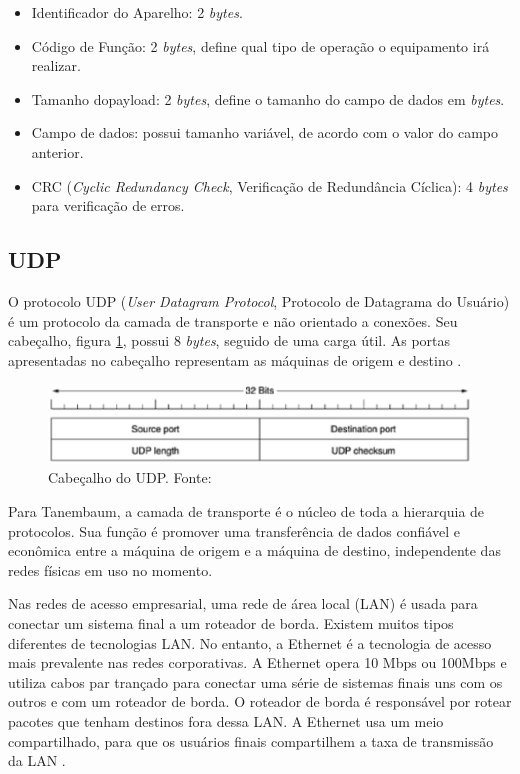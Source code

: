    \begin{itemize}
        \item Identificador do Aparelho: 2 \textit{bytes}.
        \item Código de Função: 2 \textit{bytes}, define qual tipo de operação o equipamento irá realizar.
        \item Tamanho do{payload}: 2 \textit{bytes}, define o tamanho do campo de dados em \textit{bytes}.
        \item Campo de dados: possui tamanho variável, de acordo com o valor do campo anterior.
        \item CRC (\textit{Cyclic Redundancy Check}, Verificação de Redundância Cíclica): 4 \textit{bytes} para verificação de erros.
    \end{itemize}

    \subsection{UDP}
    O protocolo UDP (\textit{User Datagram Protocol}, Protocolo de Datagrama do Usuário) é um protocolo da camada de transporte e não orientado a conexões. Seu cabeçalho, figura \ref{udp_header}, possui 8 \textit{bytes}, seguido de uma carga útil. As portas apresentadas no cabeçalho representam as máquinas de origem e destino \cite{tanenbaum_2002}.

    \begin{figure}[!htpb]
        \centering
        \includegraphics[keepaspectratio=true,scale=0.8]{figuras/udp_header.eps}
        \caption{Cabeçalho do UDP. Fonte: \cite{tanenbaum_2002}}
        \label{udp_header}
    \end{figure}

    Para Tanembaum, a camada de transporte é o núcleo de toda a hierarquia de protocolos. Sua função é promover uma transferência de dados confiável e econômica entre a máquina de origem e a máquina de destino, independente das redes físicas em uso no momento.

    Nas redes de acesso empresarial, uma rede de área local (LAN) é usada para conectar um sistema final a um roteador de borda. Existem muitos tipos diferentes de tecnologias LAN. No entanto, a Ethernet é a tecnologia de acesso mais prevalente nas redes corporativas. A Ethernet opera 10 Mbps ou 100Mbps e utiliza cabos par trançado para conectar uma série de sistemas finais uns com os outros e com um roteador de borda. O roteador de borda é responsável por rotear pacotes que tenham destinos fora dessa LAN. A Ethernet usa um meio compartilhado, para que os usuários finais compartilhem a taxa de transmissão da LAN \cite{kurose_2002}.

